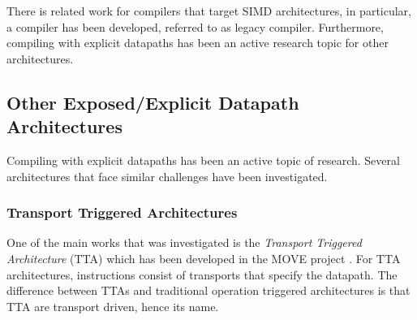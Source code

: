 



There is related work for compilers that target SIMD architectures, in particular, a compiler has been developed, referred to as legacy compiler. Furthermore, compiling with explicit datapaths has been an active research topic for other architectures.


\subsection{Other Exposed/Explicit Datapath Architectures}\label{sec:other_explicit_datapaths}
Compiling with explicit datapaths has been an active topic of research. Several architectures that face similar challenges have been investigated. 


\subsubsection{Transport Triggered Architectures}\label{sec:tta}
One of the main works that was investigated is the  \emph{Transport Triggered Architecture} (TTA) which has been developed in the MOVE project \cite{tta_codegen}. For TTA architectures, instructions consist of transports that specify the datapath. The difference between TTAs and traditional operation triggered architectures is that TTA are transport driven, hence its name. 

